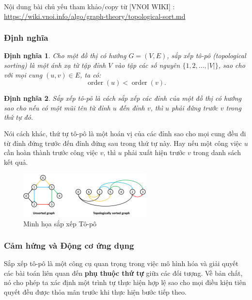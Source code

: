 \documentclass{article}
\newtheorem{dinhnghia}{Định nghĩa}
\begin{document}
Nội dung bài chủ yếu tham khảo/copy từ [VNOI WIKI] : \url{https://wiki.vnoi.info/algo/graph-theory/topological-sort.md}

\subsubsection{Định nghĩa}

\begin{dinhnghia}
Cho một đồ thị có hướng \( G = (V, E) \), sắp xếp tô-pô (topological sorting) là một ánh xạ từ tập đỉnh \( V \) vào tập các số nguyên \( \{1, 2, \dots, |V|\} \), sao cho với mọi cung \( (u, v) \in E \), ta có:
\[
\operatorname{order}(u) < \operatorname{order}(v).
\]
\end{dinhnghia}

\begin{dinhnghia}
    Sắp xếp tô-pô là cách sắp xếp các đỉnh của một đồ thị có hướng sao cho nếu có một mũi tên từ đỉnh \( u \) đến đỉnh \( v \), thì \( u \) phải đứng trước \( v \) trong thứ tự đó.
\end{dinhnghia}

Nói cách khác, thứ tự tô-pô là một hoán vị của các đỉnh sao cho mọi cung đều đi từ đỉnh đứng trước đến đỉnh đứng sau trong thứ tự này. Hay nếu một công việc \( u \) cần hoàn thành trước công việc \( v \), thì \( u \) phải xuất hiện trước \( v \) trong danh sách kết quả.



\begin{figure}[H]
    \centering
    \includegraphics[width=0.6\textwidth]{img/b2/topological_sort_img1.png}
    \caption{Minh họa sắp xếp Tô-pô}
\end{figure}

\subsubsection{Cảm hứng và Động cơ ứng dụng}

Sắp xếp tô-pô là một công cụ quan trọng trong việc mô hình hóa và giải quyết các bài toán liên quan đến \textbf{phụ thuộc thứ tự} giữa các đối tượng. Về bản chất, nó cho phép ta xác định một trình tự thực hiện hợp lệ sao cho mọi điều kiện tiên quyết đều được thỏa mãn trước khi thực hiện bước tiếp theo.
\end{document}
